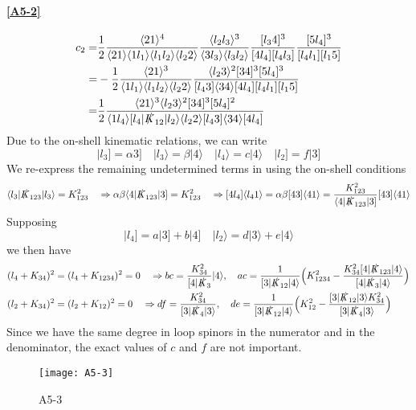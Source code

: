 \paragraph{\ref{A5-2}}
%
\begin{equation*}
\begin{split}
c_2  = & \frac{1}{2}\frac{\langle 21 \rangle^4}{\langle 21 \rangle\langle 1 l_1 \rangle\langle l_1 l_2 \rangle\langle l_2 2 \rangle}
\frac{\langle l_2 l_3\rangle^3}{\langle 3 l_3 \rangle \langle l_3 l_2 \rangle}
\frac{[l_3 4]^3}{[4l_4][l_4 l_3]}
\frac{[5 l_4]^3}{[l_4 l_1][l_1 5]}
\\
= &
-\frac{1}{2}\frac{\langle 21 \rangle^3}{\langle 1 l_1 \rangle\langle l_1 l_2 \rangle\langle l_2 2 \rangle}
\frac{\langle l_2 3 \rangle^2[34]^3[5l_4]^3}{[l_4 3]\langle 3 4 \rangle [4 l_4][l_4 l_1][l_1 5]}
\\
= & 
\frac{1}{2}
\frac{\langle 21 \rangle^3 \langle l_2 3 \rangle^2 [34]^3 [5l_4]^2}{\langle 1 l_4 \rangle [l_4|\slashed{K}_{12}|l_2\rangle\langle l_2 2 \rangle [l_4 3]\langle 34 \rangle [4l_4]}
\end{split}
\end{equation*}
Due to the on-shell kinematic relations, we can write
\begin{equation*}
|l_3] = \alpha 3] \quad
|l_3\rangle = \beta |4\rangle \quad
|l_4\rangle = c|4\rangle \quad
|l_2] = f |3]
\end{equation*}
We re-express the remaining undetermined terms in using the on-shell conditions
\begin{equation*}
\langle l_3|\slashed{K}_{123}|l_3\rangle = K_{123}^2 \quad\Rightarrow
\alpha\beta \langle 4 | \slashed{K}_{123}|3] = K_{123}^2
\quad\Rightarrow
[4l_4]\langle l_4 1 \rangle = \alpha\beta [43]\langle 41 \rangle
=\frac{K_{123}^2}{\langle 4 |\slashed{K}_{123}|3]}[43]\langle 4 1 \rangle
\end{equation*}
Supposing
\begin{equation*}
|l_4] = a|3] + b|4] \quad
|l_2\rangle = d|3\rangle + e|4\rangle
\end{equation*}
we then have
\begin{equation*}
\begin{split}
&
(l_4 + K_{34})^2 = (l_4 + K_{1234})^2 = 0
\quad\Rightarrow
bc = \frac{K_{34}^2}{[4|\slashed{K}_3}|4\rangle
,\quad
ac = \frac{1}{[3|\slashed{K}_{12}|4\rangle}\Big(K_{1234}^2 - \frac{K_{34}^2 [4|\slashed{K}_{123}|4\rangle}{[4|\slashed{K}_3|4\rangle}\Big)
\\
&
(l_2 + K_{34} )^2 = (l_2 + K_{12})^2= 0 \quad\Rightarrow
df = \frac{K_{34}^2}{[3|\slashed{K}_4|3\rangle}
,\quad
de = \frac{1}{[3 | \slashed{K}_{12}|4\rangle}\Big(K_{12}^2 - \frac{[3|\slashed{K}_{12}|3\rangle K_{34}^2}{[3|\slashed{K}_4|3\rangle}\Big)
\end{split}
\end{equation*}
Since we have the same degree in loop spinors in the numerator and in the denominator, the exact values of $c$ and $f$ are not important.
%
\begin{figure}
  \centering
    \texttt{[image: A5-3]}
    \caption{A5-3}
  \label{A5-3}
\end{figure}
